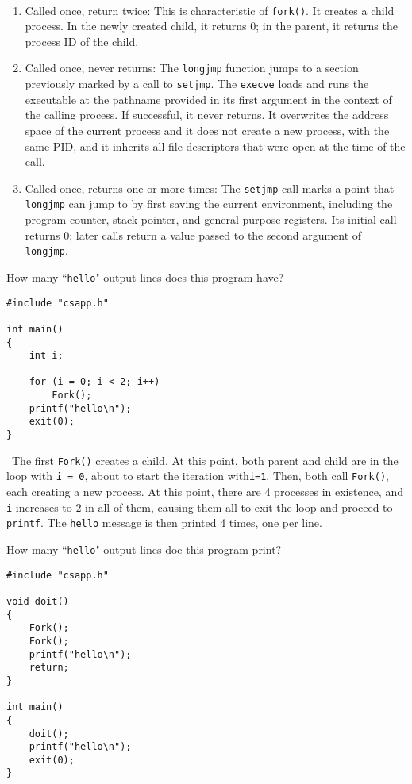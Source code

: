 \documentclass[12pt]{article}
\newenvironment{ex}[2][Exercise]{\begin{trivlist}
		\item[\hskip \labelsep {\bfseries #1}\hskip \labelsep {\bfseries #2.}]}{\end{trivlist}}
\newenvironment{sol}[1][Solution]{\begin{trivlist}
		\item[\hskip \labelsep {\bfseries #1:}]}{\end{trivlist}}
\begin{document}
\begin{sol}
	\
	\begin{enumerate}[label=(\alph*)]
		\item Called once, return twice: This is characteristic of \texttt{fork()}. It creates a child
		process. In the newly created child, it returns 0; in the parent, it returns the process ID of
		the child.
		\item Called once, never returns: The \texttt{longjmp} function jumps to a section previously
		marked by a call to \texttt{setjmp}. The \texttt{execve} loads and runs the executable at
		the pathname provided in its first argument in the context of the calling process. If successful,
		it never returns. It overwrites the address space of the current process and it does not create a new
		process, with the same PID, and it inherits all file descriptors that were open at the time of the call.		
		\item Called once, returns one or more times: The \texttt{setjmp} call marks a point that
		\texttt{longjmp} can jump to by first saving the current environment, including the 
		program counter, stack pointer, and general-purpose registers. Its initial call returns 0;
		later calls return a value passed to the second argument of \texttt{longjmp}.
	\end{enumerate}
\end{sol}

\begin{ex}{8.11}
	How many ``\texttt{hello}" output lines does this program have?
	\begin{lstlisting}[]
#include "csapp.h"

int main()
{
	int i;
	
	for (i = 0; i < 2; i++)
		Fork();
	printf("hello\n");
	exit(0);
}
	\end{lstlisting}
\end{ex}

\begin{sol}
	\
	The first \texttt{Fork()} creates a child. At this point, both parent and child are in the loop
	with \texttt{i = 0}, about to start the iteration with\texttt{i=1}. Then, both call \texttt{Fork()},
	each creating a new process. At this point, there are 4 processes in existence, and \texttt{i} increases
	to 2 in all of them, causing them all to exit the loop and proceed to \texttt{printf}. The
	\texttt{hello} message is then printed 4 times, one per line.
\end{sol}

\begin{ex}{8.12}
	How many ``\texttt{hello}" output lines doe this program print?
	\begin{lstlisting}
#include "csapp.h"

void doit()
{
	Fork();
	Fork();
	printf("hello\n");
	return;
}

int main()
{
	doit();
	printf("hello\n");
	exit(0);
}
	\end{lstlisting}
\end{ex}
\end{document}
